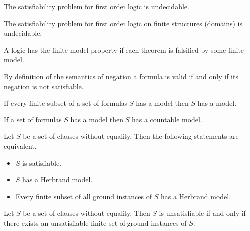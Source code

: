 \begin{theorem}
	The satisfiability problem for first order logic is undecidable.
\end{theorem}

\begin{theorem}
	The satisfiability problem for first order logic on {\myem finite} structures (domains) is undecidable.
\end{theorem}

\begin{definition}
	A logic has the finite model property if each theorem is falsified by some finite model.
\end{definition}

\begin{lemma}[Refutation]
	By definition of the semantics of negation a formula is valid if and only if its negation is not satisfiable.
\end{lemma}

\begin{theorem}\label{the:compactness}
	If every finite subset of a set of formulas $S$ has a model then $S$ has a model. 
\end{theorem}

\begin{theorem}\label{the:loewenheim}
	If a set of formulas $S$ has a model then $S$ has a countable model.
\end{theorem}

\begin{theorem}[Herbrand, 1930]\label{the:herbrand}
	Let $S$ be a set of clauses without equality. Then the following statements are equivalent.
	\begin{itemize}
		\item $S$ is satisfiable.
		\item $S$ has a Herbrand model.
		\item Every finite subset of all ground instances of $S$ has a Herbrand model.
	\end{itemize} 
\end{theorem}

\begin{corollary}
	Let $S$ be a set of clauses without equality. 
	Then $S$ is unsatisfiable if and only if there exists 
	an unsatisfiable finite set of ground instances of $S$.
\end{corollary}

